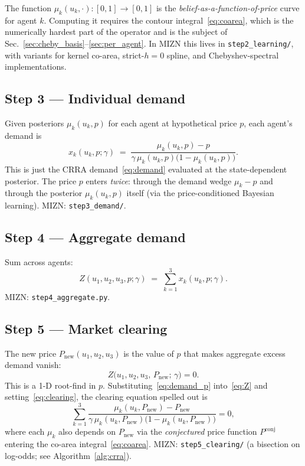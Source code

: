 \documentclass[10pt,twocolumn,a4paper]{article}
\begin{document}
The function $\mu_k(u_k, \cdot): [0,1] \to [0,1]$ is the
\emph{belief-as-a-function-of-price} curve for agent $k$. Computing it
requires the contour integral~\eqref{eq:coarea}, which is the numerically
hardest part of the operator and is the subject of
Sec.~\ref{sec:cheby_basis}--\ref{sec:per_agent}. In MIZN this lives in
\texttt{step2\_learning/}, with variants for kernel co-area, strict-$h=0$
spline, and Chebyshev-spectral implementations.

\subsection{Step 3 --- Individual demand}

Given posteriors $\mu_k(u_k, p)$ for each agent at hypothetical price $p$,
each agent's demand is
\begin{equation}
x_k(u_k, p; \gamma)
\;=\; \frac{\mu_k(u_k, p) - p}{\gamma\,\mu_k(u_k, p)\bigl(1 - \mu_k(u_k, p)\bigr)}.
\label{eq:demand_p}
\end{equation}
This is just the CRRA demand~\eqref{eq:demand} evaluated at the
state-dependent posterior. The price $p$ enters \emph{twice}: through the
demand wedge $\mu_k - p$ and through the posterior $\mu_k(u_k, p)$ itself
(via the price-conditioned Bayesian learning). MIZN: \texttt{step3\_demand/}.

\subsection{Step 4 --- Aggregate demand}

Sum across agents:
\begin{equation}
Z(u_1, u_2, u_3, p; \gamma)
\;=\; \sum_{k=1}^{3} x_k(u_k, p; \gamma).
\label{eq:Z}
\end{equation}
MIZN: \texttt{step4\_aggregate.py}.

\subsection{Step 5 --- Market clearing}

The new price $P_{\text{new}}(u_1, u_2, u_3)$ is the value of $p$ that
makes aggregate excess demand vanish:
\begin{equation}
\boxed{\;Z\bigl(u_1, u_2, u_3,\, P_{\text{new}};\, \gamma\bigr) = 0.\;}
\label{eq:clearing}
\end{equation}
This is a 1-D root-find in $p$. Substituting~\eqref{eq:demand_p}
into~\eqref{eq:Z} and setting~\eqref{eq:clearing}, the clearing equation
spelled out is
\begin{equation}
\sum_{k=1}^{3} \frac{\mu_k(u_k, P_{\text{new}}) - P_{\text{new}}}
{\gamma\, \mu_k(u_k, P_{\text{new}})\bigl(1 - \mu_k(u_k, P_{\text{new}})\bigr)}
= 0,
\label{eq:clearing_full}
\end{equation}
where each $\mu_k$ also depends on $P_{\text{new}}$ via the
\emph{conjectured} price function $P^{\text{conj}}$ entering the co-area
integral~\eqref{eq:coarea}. MIZN: \texttt{step5\_clearing/} (a bisection on
log-odds; see Algorithm~\ref{alg:crra}).
\end{document}
